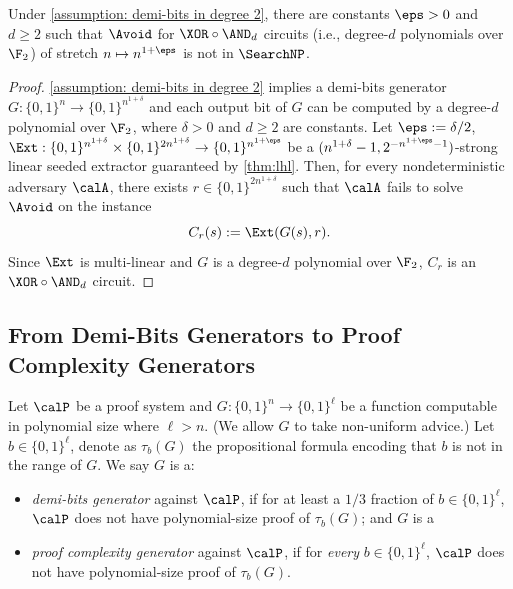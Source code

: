 \begin{corollary}
	Under \autoref{assumption: demi-bits in degree 2}, there are constants $\eps > 0$ and $d\ge 2$ such that $\Avoid$ for $\XOR\circ\AND_d$ circuits (i.e., degree-$d$ polynomials over $\F_2$) of stretch $n\mapsto n^{1+\eps}$ is not in $\SearchNP$.
\end{corollary}
\begin{proof}
	\autoref{assumption: demi-bits in degree 2} implies a demi-bits generator $G: \{0, 1\}^n \to \{0, 1\}^{n^{1+\delta}}$ and each output bit of $G$ can be computed by a degree-$d$ polynomial over $\F_2$, where $\delta > 0$ and $d\geq2$ are constants. Let $\eps := \delta/2$, $\Ext: \{0, 1\}^{n^{1+\delta}} \times \{0, 1\}^{2n^{1+\delta}} \to \{0, 1\}^{n^{1+\eps}}$ be a $(n^{1+\delta}-1,2^{-n^{1+\eps}-1})$-strong linear seeded extractor guaranteed by \autoref{thm:lhl}. Then, for every nondeterministic adversary $\calA$, there exists $r \in \{0, 1\}^{2n^{1+\delta}}$ such that $\calA$ fails to solve $\Avoid$ on the instance
	\[C_r(s) := \Ext(G(s), r).\]
	Since $\Ext$ is multi-linear and $G$ is a degree-$d$ polynomial over $\F_2$, $C_r$ is an $\XOR\circ\AND_d$ circuit.
\end{proof}








\subsection{From Demi-Bits Generators to Proof Complexity Generators}\label{subsec:pcg}
\def\hist{\mathsf{hist}}
Let $\calP$ be a proof system and $G: \{0, 1\}^n \to \{0, 1\}^\ell$ be a function computable in polynomial size where $\ell > n$. (We allow $G$ to take non-uniform advice.) Let $b \in \{0, 1\}^\ell$, denote as $\tau_b(G)$ the propositional formula encoding that $b$ is not in the range of $G$. We say $G$ is a:
\begin{itemize}
    \item \emph{demi-bits generator} against $\calP$, if for at least a $1/3$ fraction of $b \in \{0, 1\}^\ell$, $\calP$ does not have polynomial-size proof of $\tau_b(G)$; and $G$ is a
    \item \emph{proof complexity generator} against $\calP$, if for \emph{every} $b\in \{0, 1\}^\ell$, $\calP$ does not have polynomial-size proof of $\tau_b(G)$.
\end{itemize}

